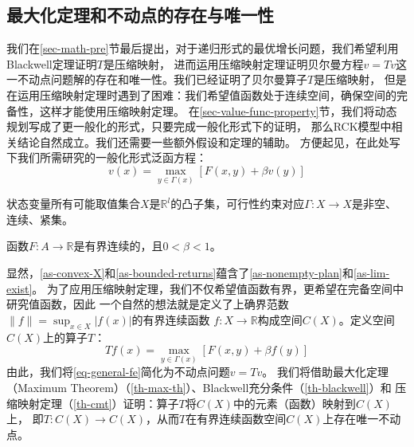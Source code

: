 \subsection{最大化定理和不动点的存在与唯一性}

我们在\ref{sec-math-pre}节最后提出，对于递归形式的最优增长问题，我们希望利用Blackwell定理证明$T$是压缩映射，
进而运用压缩映射定理证明贝尔曼方程$v=Tv$这一不动点问题解的存在和唯一性。我们已经证明了贝尔曼算子$T$是压缩映射，
但是在运用压缩映射定理时遇到了困难：我们希望值函数处于连续空间，确保空间的完备性，这样才能使用压缩映射定理。
在\ref{sec-value-func-property}节，我们将动态规划写成了更一般化的形式，只要完成一般化形式下的证明，
那么RCK模型中相关结论自然成立。我们还需要一些额外假设和定理的辅助。
方便起见，在此处写下我们所需研究的一般化形式泛函方程：
\begin{equation}    \label{eq-general-fe}
    v\left(x\right)=\max_{y\in\Gamma\left(x\right)}\left[F\left(x,y\right)+\beta v\left(y\right)\right]
\end{equation}

\begin{assumption}[凸性假设] \label{as-convex-X}
    状态变量所有可能取值集合$X$是$\mathbb{R}^l$的凸子集，可行性约束对应$\Gamma :X\rightarrow X$是非空、连续、紧集。
\end{assumption}

\begin{assumption}[有界回报]  \label{as-bounded-returns}
    函数$F: A\rightarrow \mathbb{R}$是有界连续的，且$0<\beta<1$。
\end{assumption}

显然，\cref{as-convex-X}和\cref{as-bounded-returns}蕴含了\cref{as-nonempty-plan}和\cref{as-lim-exist}。
为了应用压缩映射定理，我们不仅希望值函数有界，更希望在完备空间中研究值函数，因此
一个自然的想法就是定义了上确界范数$\|f\|=\sup _{x\in X}|f\left(x\right)|$的有界连续函数
$f: X\rightarrow \mathbb{R}$构成空间$C\left(X\right)$。定义空间$C\left(X\right)$上的算子$T$：
\begin{equation}
    Tf\left(x\right)=\max_{y\in\Gamma\left(x\right)}\left[F\left(x,y\right)+\beta f\left(y\right)\right]
\end{equation}
由此，我们将\cref{eq-general-fe}简化为不动点问题$v=Tv$。
我们将借助最大化定理（Maximum Theorem）（\cref{th-max-th}）、Blackwell充分条件（\cref{th-blackwell}）和
压缩映射定理（\cref{th-cmt}）证明：算子$T$将$C\left(X\right)$中的元素（函数）映射到$C\left(X\right)$上，
即$T: C\left(X\right)\rightarrow C\left(X\right)$，从而$T$在有界连续函数空间$C\left(X\right)$上存在唯一不动点。

